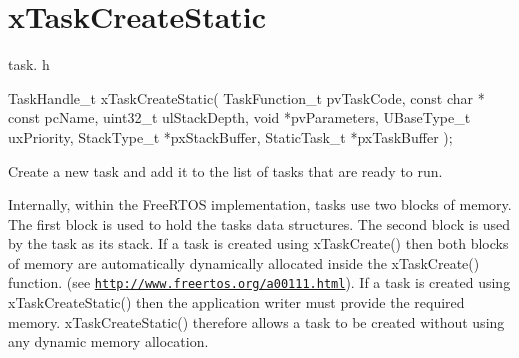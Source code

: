 \hypertarget{group__x_task_create_static}{}\section{x\+Task\+Create\+Static}
\label{group__x_task_create_static}
task. h 
\begin{DoxyPre}
TaskHandle\_t xTaskCreateStatic( TaskFunction\_t pvTaskCode,
                             const char * const pcName,
                             uint32\_t ulStackDepth,
                             void *pvParameters,
                             UBaseType\_t uxPriority,
                             StackType\_t *pxStackBuffer,
                             StaticTask\_t *pxTaskBuffer );\end{DoxyPre}


Create a new task and add it to the list of tasks that are ready to run.

Internally, within the Free\+R\+T\+OS implementation, tasks use two blocks of memory. The first block is used to hold the task\textquotesingle{}s data structures. The second block is used by the task as its stack. If a task is created using x\+Task\+Create() then both blocks of memory are automatically dynamically allocated inside the x\+Task\+Create() function. (see \href{http://www.freertos.org/a00111.html}{\tt http\+://www.\+freertos.\+org/a00111.\+html}). If a task is created using x\+Task\+Create\+Static() then the application writer must provide the required memory. x\+Task\+Create\+Static() therefore allows a task to be created without using any dynamic memory allocation.


